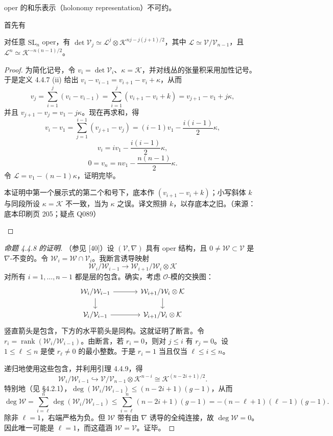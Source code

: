 \begin{proposition}
oper 的和乐表示（holonomy representation）不可约。
\end{proposition}

首先有

\begin{lemma}
对任意 $\mathrm{SL}_n$ oper，有 $\det\mathcal{V}_j\simeq\mathcal{L}^j\otimes\mathcal{K}^{nj-j(j+1)/2}$，其中 $\mathcal{L}\simeq\mathcal{V}/\mathcal{V}_{n-1}$，且 $\mathcal{L}^n\simeq\mathcal{K}^{-n(n-1)/2}$。
\end{lemma}

\begin{proof}
为简化记号，令 $v_i=\det\mathcal{V}_i$、$\kappa=\mathcal{K}$，并对线丛的张量积采用加性记号。于是定义 4.4.7 (ii) 给出 $v_i-v_{i-1}=v_{i+1}-v_i+\kappa$，从而
\[
v_j=\sum_{i=1}^{j}(v_i-v_{i-1})=\sum_{i=1}^{j}(v_{i+1}-v_i+k)=v_{j+1}-v_1+j\kappa,
\]
并且 $v_{j+1}-v_j=v_1-j\kappa$。现在再求和，得
\[
v_i-v_1=\sum_{j=1}^{i-1}(v_{j+1}-v_j)=(i-1)v_1-\frac{i(i-1)}{2}\kappa,
\]
\[
v_i=iv_1-\frac{i(i-1)}{2}\kappa,
\]
\[
0=v_n=nv_1-\frac{n(n-1)}{2}\kappa.
\]
令 $\mathcal{L}=v_1-(n-1)\kappa$，证明完毕。
\begin{annote}本证明中第一个展示式的第二个和号下，底本作 $(v_{i+1}-v_i+k)$；小写斜体 $k$ 与同段所设 $\kappa=\mathcal{K}$ 不一致，当为 $\kappa$ 之误。译文照排 $k$，以存底本之旧。（来源：底本印刷页 205；疑点 Q089）\end{annote}
\end{proof}

\begin{proof}[命题 4.4.8 的证明]
（参见 [40]）设 $(\mathcal{V},\nabla)$ 具有 oper 结构，且 $0\neq\mathcal{W}\subset\mathcal{V}$ 是 $\nabla$-不变的。令 $\mathcal{W}_i=\mathcal{W}\cap\mathcal{V}_i$。我断言诱导映射
\[
\mathcal{W}_i/\mathcal{W}_{i-1}\longrightarrow\mathcal{W}_{i+1}/\mathcal{W}_i\otimes\mathcal{K}
\]
对所有 $i=1,\dots,n-1$ 都是层的包含。确实，考虑 $\mathcal{O}$-模的交换图：
\[
\begin{tikzcd}[row sep=1.5em, column sep=3.4em]
\mathcal{W}_i/\mathcal{W}_{i-1}\arrow[r]\arrow[d] & \mathcal{W}_{i+1}/\mathcal{W}_i\otimes\mathcal{K}\arrow[d]\\
\mathcal{V}_i/\mathcal{V}_{i-1}\arrow[r] & \mathcal{V}_{i+1}/\mathcal{V}_i\otimes\mathcal{K}
\end{tikzcd}
\]
竖直箭头是包含，下方的水平箭头是同构。这就证明了断言。令 $r_i=\operatorname{rank}(\mathcal{W}_i/\mathcal{W}_{i-1})$。由断言，若 $r_i=0$，则对 $j\le i$ 有 $r_j=0$。设 $1\le\ell\le n$ 是使 $r_\ell\neq0$ 的最小整数。于是 $r_i=1$ 当且仅当 $\ell\le i\le n$。

递归地使用这些包含，并利用引理 4.4.9，得
\[
\mathcal{W}_i/\mathcal{W}_{i-1}\hookrightarrow\mathcal{V}/\mathcal{V}_{n-1}\otimes\mathcal{K}^{n-i}\cong\mathcal{K}^{(n-2i+1)/2}.
\]
特别地（见 §4.2.1），$\deg(\mathcal{W}_i/\mathcal{W}_{i-1})\le(n-2i+1)(g-1)$，从而
\[
\deg\mathcal{W}=\sum_{i=\ell}^{n}\deg(\mathcal{W}_i/\mathcal{W}_{i-1})\le\sum_{i=\ell}^{n}(n-2i+1)(g-1)=-(n-\ell+1)(\ell-1)(g-1).
\]
除非 $\ell=1$，右端严格为负。但 $\mathcal{W}$ 带有由 $\nabla$ 诱导的全纯连接，故 $\deg\mathcal{W}=0$。因此唯一可能是 $\ell=1$，而这蕴涵 $\mathcal{W}=\mathcal{V}$。证毕。
\end{proof}

